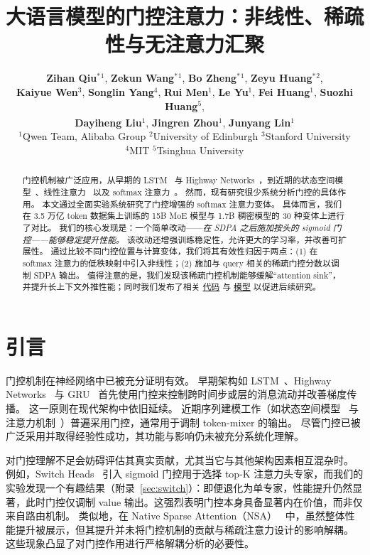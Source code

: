 \documentclass{article} %
\author{\textbf{Zihan Qiu}$^*$$^{1}$, \textbf{Zekun Wang}$^*$$^{1}$, \textbf{Bo Zheng}$^*$$^{1}$, \textbf{Zeyu Huang}$^*$$^{2}$, \\ \textbf{Kaiyue Wen}$^{3}$,  \textbf{Songlin Yang}$^{4}$, \textbf{Rui Men}$^{1}$, \textbf{Le Yu}$^{1}$, \textbf{Fei Huang}$^{1}$, \textbf{Suozhi Huang}$^{5}$, \\\textbf{Dayiheng Liu}\textsuperscript{\Letter}$^{1}$, \textbf{Jingren Zhou}$^{1}$, \textbf{Junyang Lin}\textsuperscript{\Letter}$^{1}$
\\$^1$Qwen Team, Alibaba Group   $^2$University of Edinburgh $^3$Stanford University \\ $^4$MIT $^5$Tsinghua University}
\title{大语言模型的门控注意力：非线性、稀疏性与无注意力汇聚}
\begin{document}
\maketitle

\begin{abstract}
门控机制被广泛应用，从早期的 LSTM~\citep{hochreiter1997long} 与 Highway Networks~\citep{srivastava2015highway}，到近期的状态空间模型~\citep{gu2023mamba}、线性注意力~\citep{hua2022transformer} 以及 softmax 注意力~\citep{lin2025forgetting}。
然而，现有研究很少系统分析门控的具体作用。
本文通过全面实验系统研究了门控增强的 softmax 注意力变体。
具体而言，我们在 3.5 万亿 token 数据集上训练的 15B MoE 模型与 1.7B 稠密模型的 30 种变体上进行了对比。
我们的核心发现是：一个简单改动——\textit{在 SDPA 之后施加按头的 sigmoid 门控——能够稳定提升性能。}
该改动还增强训练稳定性，允许更大的学习率，并改善可扩展性。
通过比较不同门控位置与计算变体，我们将其有效性归因于两点：(1) 在 softmax 注意力的低秩映射中引入非线性；(2) 施加与 query 相关的稀疏门控分数以调制 SDPA 输出。
值得注意的是，我们发现该稀疏门控机制能够缓解“attention sink”，并提升长上下文外推性能；同时我们发布了相关 \href{https://github.com/qiuzh20/gated_attention}{代码} 与 \href{https://huggingface.co/QwQZh/gated_attention}{模型} 以促进后续研究。

\end{abstract}

\section{引言}

门控机制在神经网络中已被充分证明有效。
早期架构如 LSTM~\citep{hochreiter1997long}、Highway Networks~\citep{srivastava2015highway} 与 GRU~\citep{dey2017gate} 首先使用门控来控制跨时间步或层的消息流动并改善梯度传播。
这一原则在现代架构中依旧延续。
近期序列建模工作（如状态空间模型~\citep{gu2023mamba,mamba2} 与注意力机制~\citep{hua2022transformer, sun2023retentivenetworksuccessortransformer,qin2024lightning,yang2024gated,lin2025forgetting}）普遍采用门控，通常用于调制 token-mixer 的输出。
尽管门控已被广泛采用并取得经验性成功，其功能与影响仍未被充分系统化理解。

对门控理解不足会妨碍评估其真实贡献，尤其当它与其他架构因素相互混杂时。
例如，Switch Heads~\citep{ csordas2024moeut, csordas2024switchhead} 引入 sigmoid 门控用于选择 top-K 注意力头专家，而我们的实验发现一个有趣结果（附录~\ref{sec:switch}）：即便退化为单专家，性能提升仍然显著，此时门控仅调制 value 输出。这强烈表明门控本身具备显著内在价值，而非仅来自路由机制。
类似地，在 Native Sparse Attention（NSA）~\citep{yuan2025native} 中，虽然整体性能提升被展示，但其提升并未将门控机制的贡献与稀疏注意力设计的影响解耦。
这些现象凸显了对门控作用进行严格解耦分析的必要性。
\end{document}
